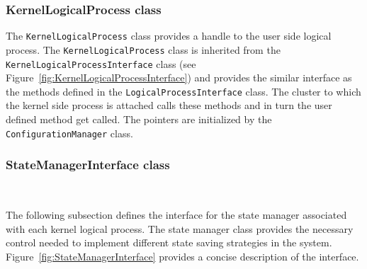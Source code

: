 \subsubsection{KernelLogicalProcess class}

The {\tt KernelLogicalProcess} class provides a handle to the user side
logical process. The {\tt Kernel\-LogicalProcess} class is inherited from
the {\tt KernelLogicalProcessInterface} class (see
Figure~\ref{fig:KernelLogicalProcessInterface}) and provides the similar
interface as the methods defined in the {\tt LogicalProcessInterface}
class. The cluster to which the kernel side process is attached calls
these methods and in turn the user defined method get called. The pointers
are initialized by the {\tt ConfigurationManager} class.

\subsubsection{StateManagerInterface class}

\begin{figure*}
\begin{center}
\ 
\end{center}
\caption{The interface every State Manager should provide to the kernel
  process.}\label{fig:StateManagerInterface}
\end{figure*}

The following subsection defines the interface for the state manager
associated with each kernel logical process. The state manager class
provides the necessary control needed to implement different state saving
strategies in the system.  Figure~\ref{fig:StateManagerInterface} provides
a concise description of the interface.

